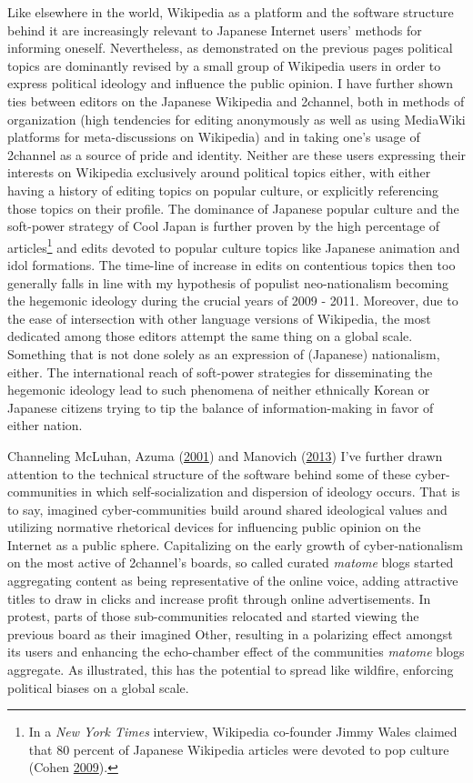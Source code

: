 \documentclass[10pt,british,A4paper,,openany]{memoir}
\begin{document}
Like elsewhere in the world, Wikipedia as a platform and the software
structure behind it are increasingly relevant to Japanese Internet
users' methods for informing oneself. Nevertheless, as demonstrated on
the previous pages political topics are dominantly revised by a small
group of Wikipedia users in order to express political ideology and
influence the public opinion. I have further shown ties between editors
on the Japanese Wikipedia and 2channel, both in methods of organization
(high tendencies for editing anonymously as well as using MediaWiki
platforms for meta-discussions on Wikipedia) and in taking one's usage
of 2channel as a source of pride and identity. Neither are these users
expressing their interests on Wikipedia exclusively around political
topics either, with either having a history of editing topics on popular
culture, or explicitly referencing those topics on their profile. The
dominance of Japanese popular culture and the soft-power strategy of
Cool Japan is further proven by the high percentage of
articles\footnote{In a \emph{New York Times} interview, Wikipedia
  co-founder Jimmy Wales claimed that 80 percent of Japanese Wikipedia
  articles were devoted to pop culture (Cohen
  \protect\hyperlink{ref-cohen_wikipedia_2009}{2009}).} and edits
devoted to popular culture topics like Japanese animation and idol
formations. The time-line of increase in edits on contentious topics
then too generally falls in line with my hypothesis of populist
neo-nationalism becoming the hegemonic ideology during the crucial years
of 2009 - 2011. Moreover, due to the ease of intersection with other
language versions of Wikipedia, the most dedicated among those editors
attempt the same thing on a global scale. Something that is not done
solely as an expression of (Japanese) nationalism, either. The
international reach of soft-power strategies for disseminating the
hegemonic ideology lead to such phenomena of neither ethnically Korean
or Japanese citizens trying to tip the balance of information-making in
favor of either nation.

Channeling McLuhan, Azuma
(\protect\hyperlink{ref-azuma_otaku:_2001}{2001}) and Manovich
(\protect\hyperlink{ref-manovich_software_2013}{2013}) I've further
drawn attention to the technical structure of the software behind some
of these cyber-communities in which self-socialization and dispersion of
ideology occurs. That is to say, imagined cyber-communities build around
shared ideological values and utilizing normative rhetorical devices for
influencing public opinion on the Internet as a public sphere.
Capitalizing on the early growth of cyber-nationalism on the most active
of 2channel's boards, so called curated \emph{matome} blogs started
aggregating content as being representative of the online voice, adding
attractive titles to draw in clicks and increase profit through online
advertisements. In protest, parts of those sub-communities relocated and
started viewing the previous board as their imagined Other, resulting in
a polarizing effect amongst its users and enhancing the echo-chamber
effect of the communities \emph{matome} blogs aggregate. As illustrated,
this has the potential to spread like wildfire, enforcing political
biases on a global scale.
\end{document}
